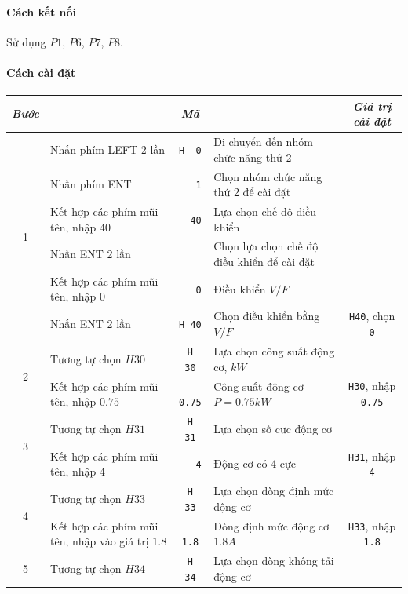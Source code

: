 \documentclass[13pt,a4paper]{extarticle}
\begin{document}
\paragraph{Cách kết nối}Sử dụng $P1$, $P6$, $P7$, $P8$.
\paragraph{Cách cài đặt}
\begin{center}
\begin{longtable}{|c|p{5cm}|c|p{5cm}|c|} \hline
\textit{Bước} & \centering{Lệnh} & \textit{Mã} & \centering{\textit{Mô tả}} & \textit{Giá trị cài đặt} \\ \hline
\multirow{6}{.6cm}{1} & Nhấn phím LEFT 2 lần & \verb|H  0| & Di chuyển đến nhóm chức năng thứ 2 & \\ \cline{2-5}
  & Nhấn phím ENT & \verb|   1| & Chọn nhóm chức năng thứ 2 để cài đặt & \\ \cline{2-5}
  & Kết hợp các phím mũi tên, nhập $40$ & \verb|  40| & Lựa chọn chế độ điều khiển &  \\ \cline{2-5}
  & Nhấn ENT 2 lần & & Chọn lựa chọn chế độ điều khiển để cài đặt & \\ \cline{2-5}
  & Kết hợp các phím mũi tên, nhập $0$ & \verb|   0| & Điều khiển $V/F$ & \\ \hline
  & Nhấn ENT 2 lần & \verb|H 40| & Chọn điều khiển bằng $V/F$ & \verb|H40|, chọn \verb|0| \\ \cline{2-5}
\multirow{2}{.6cm}{2} & Tương tự chọn $H30$ & \verb|H  30| & Lựa chọn công suất động cơ, $kW$ &  \\ \cline{2-5}     
  & Kết hợp các phím mũi tên, nhập $0.75$ & \verb| 0.75| & Công suất động cơ $P = 0.75kW$ &  \verb|H30|, nhập \verb|0.75| \\ \hline     
\multirow{2}{.6cm}{3} & Tương tự chọn $H31$ & \verb|H  31| & Lựa chọn số cưc động cơ &  \\ \cline{2-5}   
  & Kết hợp các phím mũi tên, nhập $4$ & \verb|   4| & Động cơ có 4 cực &  \verb|H31|, nhập \verb|4| \\ \hline     
\multirow{2}{.6cm}{4} & Tương tự chọn $H33$ & \verb|H  33| & Lựa chọn dòng định mức động cơ &  \\ \cline{2-5}     
  & Kết hợp các phím mũi tên, nhập vào giá trị $1.8$ & \verb|  1.8| & Dòng định mức động cơ $1.8A$&  \verb|H33|, nhập \verb|1.8| \\ \hline
\multirow{2}{.6cm}{5} & Tương tự chọn $H34$ & \verb|H  34| & Lựa chọn dòng không tải động cơ &  \\ \cline{2-5}     

\end{longtable}
\end{center}
\end{document}
